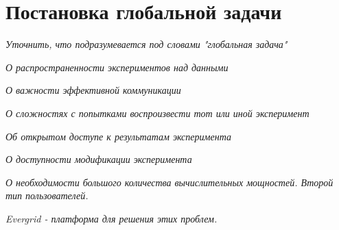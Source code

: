 \chapter{Постановка глобальной задачи}

\textit{Уточнить, что подразумевается под словами "глобальная задача"}

\textit{О распространенности экспериментов над данными}

\textit{О важности эффективной коммуникации}

\textit{О сложностях с попытками воспроизвести тот или иной эксперимент}

\textit{Об открытом доступе к результатам эксперимента}

\textit{О доступности модификации эксперимента}

\textit{О необходимости большого количества вычислительных мощностей. Второй тип пользователей.}

\textit{Evergrid - платформа для решения этих проблем.}